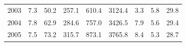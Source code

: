 \documentclass[openany]{book}
\begin{document}
\begin{table}[htbp]
{\begin{tabular}{ccccccccc}
\rowcolor[HTML]{F8F9FA} 
{\color[HTML]{202122} 2003}        & {\color[HTML]{202122} 7.3}                                                                  & {\color[HTML]{202122} 50.2}                                                                         & {\color[HTML]{202122} 257.1}                                                                    & {\color[HTML]{202122} 610.4}                                                                               & {\color[HTML]{202122} 3124.4}                                                                          & {\color[HTML]{202122} 3.3}                                                                            & {\color[HTML]{202122} 5.8}                                                                               & {\color[HTML]{202122} 29.8}                                                                              \\
\rowcolor[HTML]{F8F9FA} 
{\color[HTML]{202122} 2004}        & {\color[HTML]{202122} 7.8}                                                                  & {\color[HTML]{202122} 62.9}                                                                         & {\color[HTML]{202122} 284.6}                                                                    & {\color[HTML]{202122} 757.0}                                                                               & {\color[HTML]{202122} 3426.5}                                                                          & {\color[HTML]{202122} 7.9}                                                                            & {\color[HTML]{202122} 5.6}                                                                               & {\color[HTML]{202122} 29.4}                                                                              \\
\rowcolor[HTML]{F8F9FA} 
{\color[HTML]{202122} 2005}        & {\color[HTML]{202122} 7.5}                                                                  & {\color[HTML]{202122} 73.2}                                                                         & {\color[HTML]{202122} 315.7}                                                                    & {\color[HTML]{202122} 873.1}                                                                               & {\color[HTML]{202122} 3765.8}                                                                          & {\color[HTML]{202122} 8.4}                                                                            & {\color[HTML]{202122} 5.3}                                                                               & {\color[HTML]{202122} 28.7}                                                                              \\

\end{tabular}}
\end{table}
\end{document}
